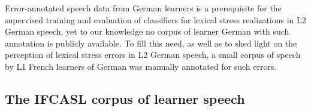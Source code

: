 \documentclass[a4paper]{article}
\begin{document}
	Error-annotated speech data from German learners is a prerequisite for the supervised training and evaluation of classifiers for  lexical stress realizations in L2 German speech, yet to our knowledge no corpus of learner German with such annotation is publicly available. To fill this need, as well as to shed light on the perception of lexical stress errors in L2 German speech, a small corpus of speech by L1 French learners of German was manually annotated for such errors.
	
		\subsection{The IFCASL corpus of learner speech}
		\label{sec:data:corpus}		
		
\end{document}
